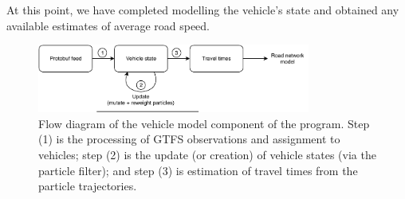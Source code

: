 At this point, we have completed modelling the vehicle's state and obtained any available estimates of average road speed.




\begin{figure}
\centering
\includegraphics[width=0.8\textwidth,clip,trim={0 1mm 0 0}]{chapters/chapter03/program_overview.pdf}
\caption{Flow diagram of the vehicle model component of the program. Step (1) is the processing of GTFS observations and assignment to vehicles; step (2) is the update (or creation) of vehicle states (via the particle filter); and step (3) is estimation of travel times from the particle trajectories.}
\label{fig:program_flow}
\end{figure}
